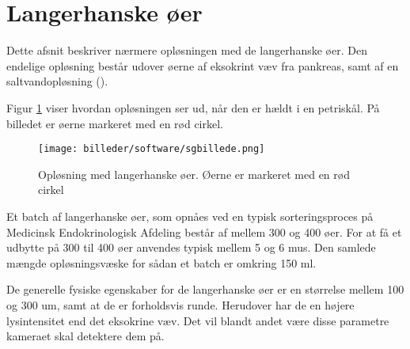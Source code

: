 \newpage
\section{Langerhanske øer}
Dette afsnit beskriver nærmere opløsningen med de langerhanske øer. Den endelige opløsning består udover øerne af eksokrint væv fra pankreas, samt af en saltvandopløsning (\cite{hbbs}). 

Figur \ref{fig:islet} viser hvordan opløsningen ser ud, når den er hældt i en petriskål. På billedet er øerne markeret med en rød cirkel.

\begin{figure}[H]
	\centering
	\texttt{[image: billeder/software/sgbillede.png]}
	\caption{Opløsning med langerhanske øer. Øerne er markeret med en rød cirkel}
	\label{fig:islet}
\end{figure}

Et batch af langerhanske øer, som opnåes ved en typisk sorteringsproces på Medicinsk Endokrinologisk Afdeling består af mellem 300 og 400 øer. For at få et udbytte på 300 til 400 øer anvendes typisk mellem 5 og 6 mus. Den samlede mængde opløsningsvæske for sådan et batch er omkring 150 ml.

De generelle fysiske egenskaber for de langerhanske øer er en størrelse mellem 100 og 300 um, samt at de er forholdsvis runde. Herudover har de en højere lysintensitet end det eksokrine væv. Det vil blandt andet være disse parametre kameraet skal detektere dem på.





